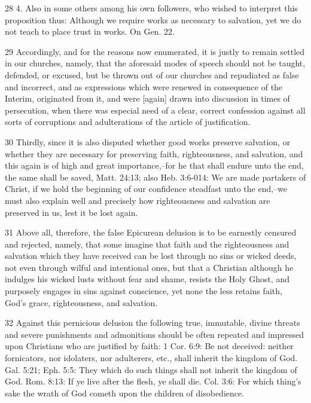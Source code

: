 28 4. Also in some others among his own followers, who wished to interpret this proposition thus: Although we require works as necessary to salvation, yet we do not teach to place trust in works. On Gen. 22.

29 Accordingly, and for the reasons now enumerated, it is justly to remain settled in our churches, namely, that the aforesaid modes of speech should not be taught, defended, or excused, but be thrown out of our churches and repudiated as false and incorrect, and as expressions which were renewed in consequence of the Interim, originated from it, and were [again] drawn into discussion in times of persecution, when there was especial need of a clear, correct confession against all sorts of corruptions and adulterations of the article of justification.

30 Thirdly, since it is also disputed whether good works preserve salvation, or whether they are necessary for preserving faith, righteousness, and salvation, and this again is of high and great importance,–for he that shall endure unto the end, the same shall be saved, Matt. 24:13; also Heb. 3:6-014: We are made partakers of Christ, if we hold the beginning of our confidence steadfast unto the end,–we must also explain well and precisely how righteousness and salvation are preserved in us, lest it be lost again.

31 Above all, therefore, the false Epicurean delusion is to be earnestly censured and rejected, namely, that some imagine that faith and the righteousness and salvation which they have received can be lost through no sins or wicked deeds, not even through wilful and intentional ones, but that a Christian although he indulges his wicked lusts without fear and shame, resists the Holy Ghost, and purposely engages in sins against conscience, yet none the less retains faith, God’s grace, righteousness, and salvation.

32 Against this pernicious delusion the following true, immutable, divine threats and severe punishments and admonitions should be often repeated and impressed upon Christians who are justified by faith: 1 Cor. 6:9: Be not deceived: neither fornicators, nor idolaters, nor adulterers, etc., shall inherit the kingdom of God. Gal. 5:21; Eph. 5:5: They which do such things shall not inherit the kingdom of God. Rom. 8:13: If ye live after the flesh, ye shall die. Col. 3:6: For which thing’s sake the wrath of God cometh upon the children of disobedience.

